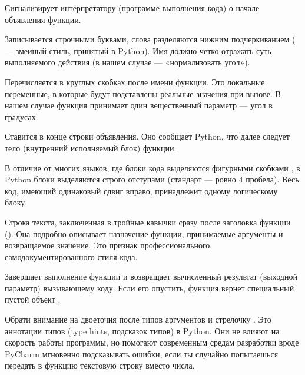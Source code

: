 \begin{syntaxdesc}
    \item[Объявление функции (строки 1, 16) \mycode{def}] Сигнализирует интерпретатору (программе выполнения кода) о начале объявления функции.
    \item[Имя функции (строка 16) \mycode{normalize_angle}] Записывается строчными буквами, слова разделяются нижним подчеркиванием ( --- змеиный стиль, принятый в Python). Имя должно четко отражать суть выполняемого действия (в нашем случае --- «нормализовать угол»).
    \item[Параметр функции (строки 1, 16) \mycode{(angle: float)}] Перечисляется в круглых скобках после имени функции. Это локальные переменные, в которые будут подставлены реальные значения при вызове. В нашем случае функция принимает один вещественный параметр --- угол в градусах.
    \item[Двоеточие-разделитель (строки 1, 10, 16) \mycode{:}] Ставится в конце строки объявления. Оно сообщает Python, что далее следует тело (внутренний исполняемый блок) функции.
    \item[Сдвиг строки (отступы, строки 6--13, 17--23)] В отличие от многих языков, где блоки кода выделяются фигурными скобками \mycode{{}}, в Python блоки выделяются строго отступами (стандарт --- ровно 4 пробела). Весь код, имеющий одинаковый сдвиг вправо, принадлежит одному логическому блоку.
    \item[Строка документации (строки 2--5, 17--20) \mycode{"""..."""}] Строка текста, заключенная в тройные кавычки сразу после заголовка функции (). Она подробно описывает назначение функции, принимаемые аргументы и возвращаемое значение. Это признак профессионального, самодокументированного стиля кода.
    \item[Возвращаемый результат (строка 13) \mycode{return}] Завершает выполнение функции и возвращает вычисленный результат (выходной параметр) вызывающему коду. Если его опустить, функция вернет специальный пустой объект .
\end{syntaxdesc}

Обрати внимание на двоеточия после типов аргументов  и стрелочку . Это аннотации типов (type hints, подсказок типов) в Python. Они не влияют на скорость работы программы, но помогают современным средам разработки вроде PyCharm мгновенно подсказывать ошибки, если ты случайно попытаешься передать в функцию текстовую строку вместо числа.

